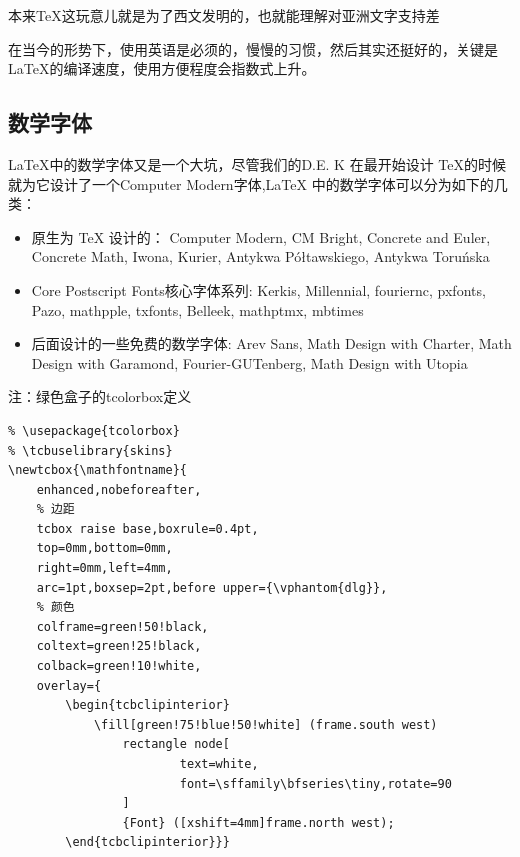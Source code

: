 \documentclass[12pt]{article}
\begin{document}
\begin{warning}
\; 本来{\sffamily \TeX}这玩意儿就是为了西文发明的，也就能理解对亚洲文字支持差

\; 在当今的形势下，使用英语是必须的，慢慢的习惯，然后其实还挺好的，关键是{\ttfamily \LaTeX}的编译速度，使用方便程度会指数式上升。
\end{warning}



\subsection{数学字体}
{\ttfamily \LaTeX}中的数学字体又是一个大坑，尽管我们的{D.E. K} 在最开始设计
{\ttfamily \TeX}的时候就为它设计了一个Computer Modern字体,{\ttfamily \LaTeX}
中的数学字体可以分为如下的几类：
\begin{itemize}
    \item {} 原生为 {\ttfamily \TeX} 设计的：
        Computer Modern, CM Bright, Concrete and Euler, Concrete Math,
        Iwona, Kurier, Antykwa Półtawskiego, Antykwa Toru\' nska
    \item {} Core Postscript Fonts核心字体系列:
        Kerkis, Millennial, fouriernc, pxfonts, Pazo, mathpple, txfonts, Belleek,
        mathptmx, mbtimes
    \item {} 后面设计的一些免费的数学字体:
        Arev Sans, Math Design with Charter, Math Design with Garamond,
        Fourier-GUTenberg, Math Design with Utopia
\end{itemize}

注：绿色盒子的tcolorbox定义
\begin{lstlisting}
% \usepackage{tcolorbox}
% \tcbuselibrary{skins}
\newtcbox{\mathfontname}{
    enhanced,nobeforeafter,
    % 边距
    tcbox raise base,boxrule=0.4pt,
    top=0mm,bottom=0mm,
    right=0mm,left=4mm,
    arc=1pt,boxsep=2pt,before upper={\vphantom{dlg}},
    % 颜色
    colframe=green!50!black,
    coltext=green!25!black,
    colback=green!10!white,
    overlay={
        \begin{tcbclipinterior}
            \fill[green!75!blue!50!white] (frame.south west)
                rectangle node[
                        text=white,
                        font=\sffamily\bfseries\tiny,rotate=90
                ] 
                {Font} ([xshift=4mm]frame.north west);
        \end{tcbclipinterior}}}
\end{lstlisting}
\end{document}
